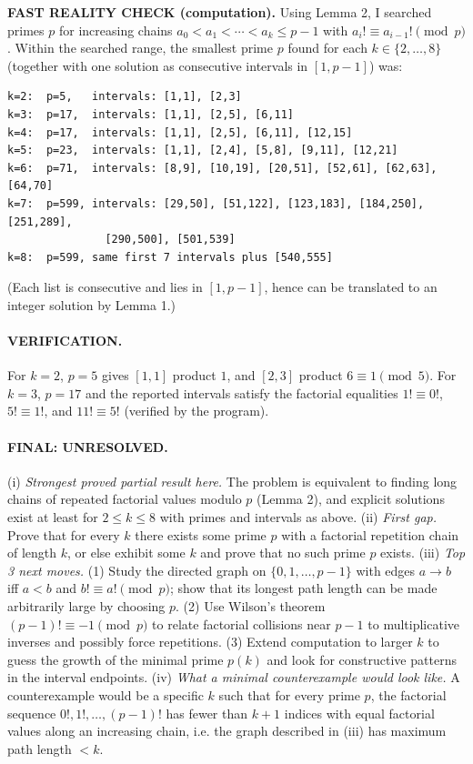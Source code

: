 \textbf{FAST REALITY CHECK (computation).}
Using Lemma 2, I searched primes $p$ for increasing chains $a_0<a_1<\cdots<a_k\le p-1$ with $a_i!\equiv a_{i-1}!\pmod p$.
Within the searched range, the smallest prime $p$ found for each $k\in\{2,\dots,8\}$ (together with one solution as consecutive intervals in $[1,p-1]$) was:
\begin{verbatim}
k=2:  p=5,   intervals: [1,1], [2,3]
k=3:  p=17,  intervals: [1,1], [2,5], [6,11]
k=4:  p=17,  intervals: [1,1], [2,5], [6,11], [12,15]
k=5:  p=23,  intervals: [1,1], [2,4], [5,8], [9,11], [12,21]
k=6:  p=71,  intervals: [8,9], [10,19], [20,51], [52,61], [62,63], [64,70]
k=7:  p=599, intervals: [29,50], [51,122], [123,183], [184,250], [251,289],
               [290,500], [501,539]
k=8:  p=599, same first 7 intervals plus [540,555]
\end{verbatim}
(Each list is consecutive and lies in $[1,p-1]$, hence can be translated to an integer solution by Lemma 1.)

\paragraph{VERIFICATION.}
For $k=2$, $p=5$ gives $[1,1]$ product $1$, and $[2,3]$ product $6\equiv 1\pmod 5$.
For $k=3$, $p=17$ and the reported intervals satisfy the factorial equalities $1!\equiv 0!$, $5!\equiv 1!$, and $11!\equiv 5!$ (verified by the program).

\paragraph{FINAL: UNRESOLVED.}
(i) \emph{Strongest proved partial result here.} The problem is equivalent to finding long chains of repeated factorial values modulo $p$ (Lemma 2), and explicit solutions exist at least for $2\le k\le 8$ with primes and intervals as above.
(ii) \emph{First gap.} Prove that for every $k$ there exists some prime $p$ with a factorial repetition chain of length $k$, or else exhibit some $k$ and prove that no such prime $p$ exists.
(iii) \emph{Top 3 next moves.} (1) Study the directed graph on $\{0,1,\dots,p-1\}$ with edges $a\to b$ iff $a<b$ and $b!\equiv a!\pmod p$; show that its longest path length can be made arbitrarily large by choosing $p$. (2) Use Wilson's theorem $(p-1)!\equiv -1\pmod p$ to relate factorial collisions near $p-1$ to multiplicative inverses and possibly force repetitions. (3) Extend computation to larger $k$ to guess the growth of the minimal prime $p(k)$ and look for constructive patterns in the interval endpoints.
(iv) \emph{What a minimal counterexample would look like.} A counterexample would be a specific $k$ such that for every prime $p$, the factorial sequence $0!,1!,\dots,(p-1)!$ has fewer than $k+1$ indices with equal factorial values along an increasing chain, i.e. the graph described in (iii) has maximum path length $<k$.




